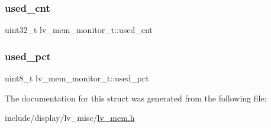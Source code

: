 \mbox{\label{structlv__mem__monitor__t_aa2404ca716ab5481106528be7925bff6}} 
\subsubsection{\texorpdfstring{used\_cnt}{used\_cnt}}
{\footnotesize\ttfamily uint32\+\_\+t lv\+\_\+mem\+\_\+monitor\+\_\+t\+::used\+\_\+cnt}

\mbox{\label{structlv__mem__monitor__t_a729716db06d7a5ecb2fea65bdc29e6aa}} 
\subsubsection{\texorpdfstring{used\_pct}{used\_pct}}
{\footnotesize\ttfamily uint8\+\_\+t lv\+\_\+mem\+\_\+monitor\+\_\+t\+::used\+\_\+pct}



The documentation for this struct was generated from the following file\+:\begin{DoxyCompactItemize}
\item 
include/display/lv\+\_\+misc/\mbox{\hyperlink{lv__mem_8h}{lv\+\_\+mem.\+h}}\end{DoxyCompactItemize}
